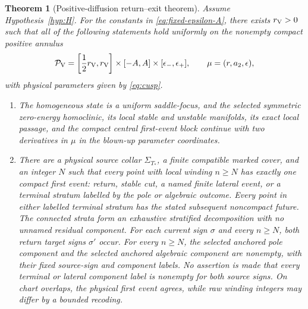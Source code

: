 \documentclass[11pt,reqno]{amsart}
\numberwithin{equation}{section}
\newtheorem{theorem}{Theorem}[section]
\theoremstyle{definition}
\theoremstyle{remark}
\newcommand{\cP}{\mathcal P}
\begin{document}
\begin{theorem}[Positive-diffusion return--exit theorem]\label{thm:main}
Assume Hypothesis~\ref{hyp:H}.  For the constants in
\eqref{eq:fixed-epsilon-A}, there exists $r_{\rm V}>0$ such that all of the
following statements hold uniformly on the nonempty compact positive annulus
\begin{equation}\label{eq:PV}
 \cP_{\rm V}=
 \left[\frac12r_{\rm V},r_{\rm V}\right]
 \times[-A,A]\times[\epsilon_-,\epsilon_+],
 \qquad \mu=(r,a_2,\epsilon),
\end{equation}
with physical parameters given by \eqref{eq:cusp}.

\begin{enumerate}
 \item The homogeneous state is a uniform saddle-focus, and the selected
 symmetric zero-energy homoclinic, its local stable and unstable manifolds,
 its exact local passage, and the compact central first-event block continue
 with two derivatives in $\mu$ in the blown-up parameter coordinates.

 \item There are a physical source collar $\Sigma_{T_*}$, a finite
 compatible marked cover, and an integer $N$ such that every point with local
 winding $n\ge N$ has
 exactly one compact first event: return, stable cut, a named finite lateral
 event, or a terminal stratum labelled by the pole or algebraic outcome.
 Every point in either labelled terminal stratum has the stated subsequent
 noncompact future.  The connected strata form an exhaustive stratified
 decomposition with no unnamed residual component.  For each current sign
 $\sigma$ and every $n\ge N$, both return target signs $\sigma'$ occur.  For
 every $n\ge N$, the selected anchored pole component and the selected
 anchored algebraic component are nonempty, with their fixed source-sign and
 component labels.  No assertion is made that every terminal or lateral
 component label is nonempty for both source signs.  On chart overlaps, the physical
 first event agrees, while raw winding integers may differ by a bounded
 recoding.


\end{enumerate}
\end{theorem}
\end{document}
